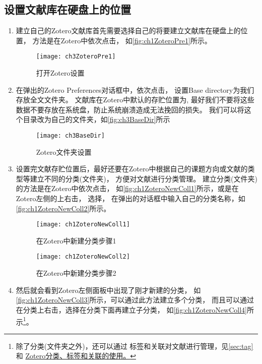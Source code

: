 \documentclass[cn,11pt,chinese]{elegantbook}
\begin{document}
		\subsection{设置文献库在硬盘上的位置} 
		\begin{enumerate}
			\item 
			建立自己的Zotero文献库首先需要选择自己的将要建立文献库在硬盘上的位置，
			方法是在Zotero中依次点击，
			如\autoref{fig:ch1ZoteroPre1}所示。
			\begin{figure}[htbp]
				\centering
				\texttt{[image: ch3ZoteroPre1]}
				\caption{打开Zotero设置}
				\label{fig:ch1ZoteroPre1}
			\end{figure}
			
			\item 
			在弹出的Zotero Preferences对话框中，依次点击，
			设置Base directory为我们存放全文文件夹。
			文献库在Zotero中默认的存贮位置为,
			最好我们不要将这些数据不要存放在系统盘，防止系统崩溃造成无法挽回的损失。
			我们可以将这个目录改为自己的文件夹，如\autoref{fig:ch3BaseDir}所示
			\begin{figure}[htbp]
				\centering
				\texttt{[image: ch3BaseDir]}
				\caption{Zotero文件夹设置}
				\label{fig:ch3BaseDir}
			\end{figure}
			\item \label{sec:creat_folder}
			设置完文献存贮位置后，最好还要在Zotero中根据自己的课题方向或文献的类型等建立不同的分类(文件夹)，
			方便对文献进行分类管理。
			建立分类(文件夹)的方法是在Zotero中依次点击，
			如\autoref{fig:ch1ZoteroNewColl1}所示，或是在Zotero左侧的上右击，
			选择，
			在弹出的对话框中输入自己的分类名称，如\autoref{fig:ch1ZoteroNewColl2}所示。
			\begin{figure}
				\centering
				\begin{minipage}[t]{\dimexpr0.5\textwidth-4em}
					\centering
					\texttt{[image: ch1ZoteroNewColl1]}
					\caption{在Zotero中新建分类步骤1}
					\label{fig:ch1ZoteroNewColl1}
				\end{minipage}
			\hspace{1.5cm}
				\begin{minipage}[t]{\dimexpr0.5\textwidth-4em}
					\centering
					\texttt{[image: ch1ZoteroNewColl2]}
					\caption{在Zotero中新建分类步骤2}
					\label{fig:ch1ZoteroNewColl2}
				\end{minipage}
			\end{figure}
			\item 
			然后就会看到Zotero左侧面板中出现了刚才新建的分类，
			如\autoref{fig:ch1ZoteroNewColl3}所示，可以通过此方法建立多个分类，
			而且可以通过在分类上右击，选择在分类下面再建立子分类，
			如\autoref{fig:ch1ZoteroNewColl4}所示\footnote{除了分类(文件夹之外)，还可以通过
			标签和关联对文献进行管理，见\cref{sec:tag}和
			\href{https://zhuanlan.zhihu.com/p/275707703}{Zotero分类、标签和关联的使用。}}。
			

\end{enumerate}
\end{document}
